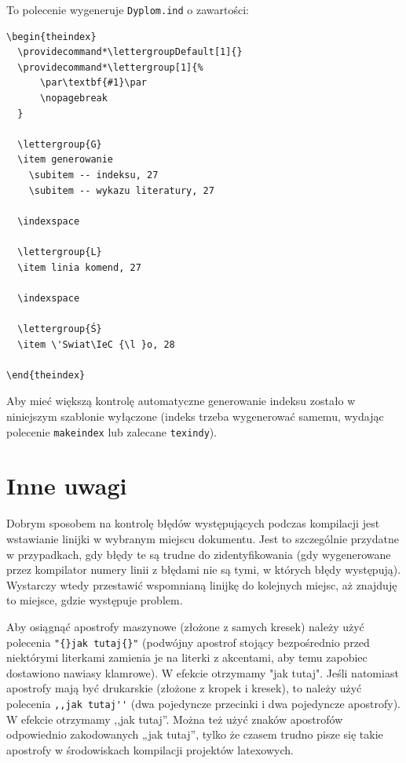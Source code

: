 \begin{itemize}
To polecenie wygeneruje \texttt{Dyplom.ind} o zawartości:
\begin{lstlisting}[basicstyle=\footnotesize\ttfamily]
\begin{theindex}
  \providecommand*\lettergroupDefault[1]{}
  \providecommand*\lettergroup[1]{%
      \par\textbf{#1}\par
      \nopagebreak
  }

  \lettergroup{G}
  \item generowanie
    \subitem -- indeksu, 27
    \subitem -- wykazu literatury, 27

  \indexspace

  \lettergroup{L}
  \item linia komend, 27

  \indexspace

  \lettergroup{Ś}
  \item \'Swiat\IeC {\l }o, 28

\end{theindex}
\end{lstlisting}


\end{itemize}


Aby mieć większą kontrolę automatyczne generowanie indeksu zostało w niniejszym szablonie wyłączone (indeks trzeba wygenerować samemu, wydając polecenie \texttt{makeindex} lub zalecane \texttt{texindy}).

\section{Inne uwagi}
Dobrym sposobem na kontrolę błędów występujących podczas kompilacji jest wstawianie linijki \verb?? w wybranym miejscu dokumentu. Jest to szczególnie przydatne w przypadkach, gdy błędy te są trudne do zidentyfikowania (gdy wygenerowane przez kompilator numery linii z błędami nie są tymi, w których błędy występują). Wystarczy wtedy przestawić wspomnianą linijkę do kolejnych miejsc, aż znajduję to miejsce, gdzie występuje problem.

Aby osiągnąć apostrofy maszynowe (złożone z samych kresek) należy użyć polecenia \verb?"{}jak tutaj{}"? (podwójny apostrof stojący bezpośrednio przed niektórymi literkami zamienia je na literki z akcentami, aby temu zapobiec dostawiono nawiasy klamrowe). W efekcie otrzymamy "{}jak tutaj{}". Jeśli natomiast apostrofy mają być drukarskie (złożone z kropek i kresek), to należy użyć polecenia \verb?,,jak tutaj''? (dwa pojedyncze przecinki i dwa pojedyncze apostrofy). W efekcie otrzymamy ,,jak tutaj''. Można też użyć znaków apostrofów odpowiednio zakodowanych „jak tutaj”, tylko że czasem trudno pisze się takie apostrofy w środowiskach kompilacji projektów latexowych.


